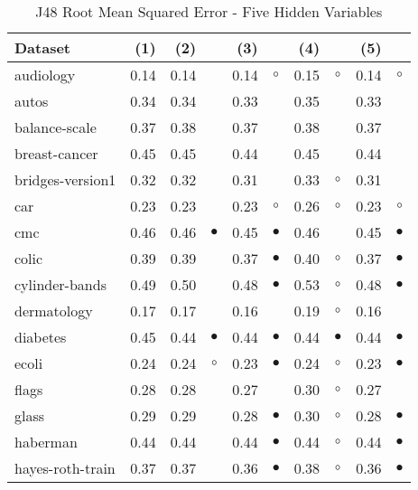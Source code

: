 \newpage
{\centering \footnotesize \begin{longtable}{lrr@{\hspace{0.1cm}}cr@{\hspace{0.1cm}}cr@{\hspace{0.1cm}}cr@{\hspace{0.1cm}}c}
\caption{\label{j48rmse5}J48 Root Mean Squared Error - Five Hidden Variables}
\\
\hline
Dataset & (1)& (2) & & (3) & & (4) & & (5) & \\
\hline
audiology & 0.14 & 0.14 &           & 0.14 &   $\circ$ & 0.15 &   $\circ$ & 0.14 &   $\circ$\\
autos & 0.34 & 0.34 &           & 0.33 &           & 0.35 &           & 0.33 &          \\
balance-scale & 0.37 & 0.38 &           & 0.37 &           & 0.38 &           & 0.37 &          \\
breast-cancer & 0.45 & 0.45 &           & 0.44 &           & 0.45 &           & 0.44 &          \\
bridges-version1 & 0.32 & 0.32 &           & 0.31 &           & 0.33 &   $\circ$ & 0.31 &          \\
car & 0.23 & 0.23 &           & 0.23 &   $\circ$ & 0.26 &   $\circ$ & 0.23 &   $\circ$\\
cmc & 0.46 & 0.46 & $\bullet$ & 0.45 & $\bullet$ & 0.46 &           & 0.45 & $\bullet$\\
colic & 0.39 & 0.39 &           & 0.37 & $\bullet$ & 0.40 &   $\circ$ & 0.37 & $\bullet$\\
cylinder-bands & 0.49 & 0.50 &           & 0.48 & $\bullet$ & 0.53 &   $\circ$ & 0.48 & $\bullet$\\
dermatology & 0.17 & 0.17 &           & 0.16 &           & 0.19 &   $\circ$ & 0.16 &          \\
diabetes & 0.45 & 0.44 & $\bullet$ & 0.44 & $\bullet$ & 0.44 & $\bullet$ & 0.44 & $\bullet$\\
ecoli & 0.24 & 0.24 &   $\circ$ & 0.23 & $\bullet$ & 0.24 &   $\circ$ & 0.23 & $\bullet$\\
flags & 0.28 & 0.28 &           & 0.27 &           & 0.30 &   $\circ$ & 0.27 &          \\
glass & 0.29 & 0.29 &           & 0.28 & $\bullet$ & 0.30 &   $\circ$ & 0.28 & $\bullet$\\
haberman & 0.44 & 0.44 &           & 0.44 & $\bullet$ & 0.44 &   $\circ$ & 0.44 & $\bullet$\\
hayes-roth-train & 0.37 & 0.37 &           & 0.36 & $\bullet$ & 0.38 &   $\circ$ & 0.36 & $\bullet$\\

\end{longtable}}
